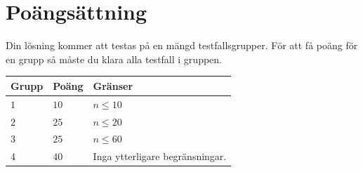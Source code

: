 \section*{Poängsättning}
Din lösning kommer att testas på en mängd testfallsgrupper.
För att få poäng för en grupp så måste du klara alla testfall i gruppen.

\noindent
\begin{tabular}{| l | l | p{12cm} |}
  \hline
  \textbf{Grupp} & \textbf{Poäng} & \textbf{Gränser} \\ \hline
  $1$    & $10$       & $n \leq 10$ \\ \hline
  $2$    & $25$       & $n \leq 20$ \\ \hline
  $3$    & $25$       & $n \leq 60$ \\ \hline
  $4$    & $40$       & Inga ytterligare begränsningar. \\ \hline
\end{tabular}
